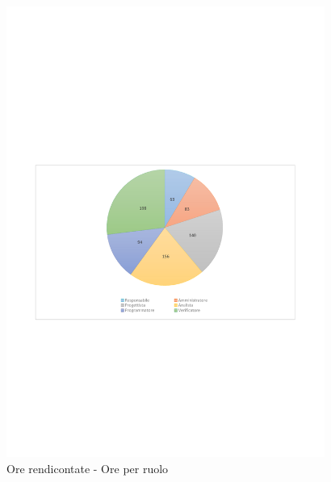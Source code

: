 \documentclass[../PianoProgetto.tex]{subfiles}
\begin{document}
	\begin{figure}[H]
		\centering
		\includegraphics[width=0.93\textwidth , trim=1.5cm 9cm 1.5cm 9cm]{grafici/Riepilogo/Rendicontate/ore-ruolo}
			\caption{Ore rendicontate - Ore per ruolo}
		\label{fig:CircleChart-rendicontate_ore_r}
	\end{figure}
\vfill	
\end{document}
